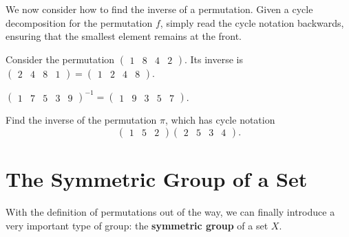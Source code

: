 We now consider how to find the inverse of a permutation. Given a cycle decomposition for the permutation $f$, simply read the cycle notation backwards, ensuring that the smallest element remains at the front.

\begin{example}
    Consider the permutation $\begin{pmatrix}1 & 8 & 4 & 2\end{pmatrix}$. Its inverse is $\begin{pmatrix}2 & 4 & 8 & 1\end{pmatrix} = \begin{pmatrix}1 & 2 & 4 & 8\end{pmatrix}$.
\end{example}

\begin{example}
    $\begin{pmatrix}1 & 7 & 5 & 3 & 9\end{pmatrix}^{-1} = \begin{pmatrix}1 & 9 & 3 & 5 & 7\end{pmatrix}$.
\end{example}

\begin{exercise}
    Find the inverse of the permutation $\pi$, which has cycle notation
    \[
        \begin{pmatrix}1 & 5 & 2\end{pmatrix}\begin{pmatrix}2 & 5 & 3 & 4\end{pmatrix}.
    \]
\end{exercise}

\section{The Symmetric Group of a Set}
With the definition of permutations out of the way, we can finally introduce a very important type of group: the \textbf{symmetric group} of a set $X$.

